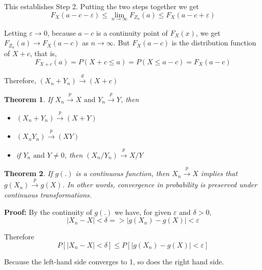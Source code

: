 \documentclass{article}
\newtheorem{theorem}{Theorem}[section]
\begin{document}
This establishes Step 2. Putting the two steps together we get
\begin{equation*}
    F_X(a-c-\varepsilon) \leq \lim_{n \rightarrow \infty} F_{Z_n}(a) \leq F_X(a-c+\varepsilon)
\end{equation*}

Letting \(\varepsilon \rightarrow 0\), because \(a-c\) is a continuity point of \(F_X(x)\), we get \(F_{Z_n}(a) \rightarrow F_X(a-c)\) as \(n \rightarrow \infty\). But \(F_X(a-c)\) is the distribution function of \(X+c\), that is,
\begin{equation*}
    F_{X+c}(a)=P(X+c\leq a)=P(X \leq a-c)=F_X(a-c)
\end{equation*}

Therefore, \((X_n+Y_n) \stackrel{d} \longrightarrow (X+c)\)   

\begin{theorem}
    If \(X_n \stackrel{p} \longrightarrow X \text{ and } Y_n \stackrel{p} \longrightarrow Y\), then \begin{itemize}
        \item[(a)] \((X_n+Y_n) \stackrel{p} \longrightarrow (X+Y)\)
        \item[(b)] \((X_nY_n)\stackrel{p} \longrightarrow (XY)\)
        \item[(c)] if \(Y_n \text{ and } Y \neq 0\), then \((X_n/Y_n) \stackrel{p} \longrightarrow X/Y\)
    \end{itemize}
\end{theorem}

\begin{theorem}
    If \(g(.)\) is a continuous function, then \(X_n \stackrel{p} \longrightarrow X\) implies that \(g(X_n) \stackrel{p} \longrightarrow g(X)\). In other words, convergence in probability is preserved under continuous transformations.
\end{theorem}

\textbf{Proof:} By the continuity of \(g(.)\) we have, for given \(\varepsilon \text{ and } \delta>0\),
\begin{equation*}
    |X_n-X|<\delta => |g(X_n)-g(X)|<\varepsilon
\end{equation*}

Therefore
\begin{equation*}
    P[|X_n-X|<\delta] \leq P[|g(X_n)-g(X)|<\varepsilon]
\end{equation*}

Because the left-hand side converges to 1, so does the right hand side.
\end{document}
